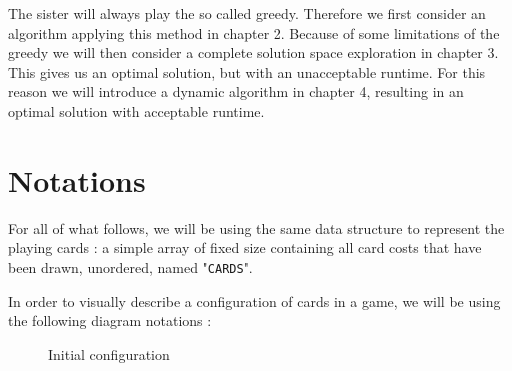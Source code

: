 \documentclass[a4paper,12pt,fleqn]{article}
\begin{document}
The sister will always play the so called \gls{greedy}. Therefore we first consider an algorithm applying this method in chapter 2. Because of some limitations of the \gls{greedy} we will then consider a complete solution space exploration in chapter 3. This gives us an optimal solution, but with an unacceptable runtime. For this reason we will introduce a dynamic algorithm in chapter 4, resulting in an optimal solution with acceptable runtime.

\newpage
\section{Notations}

For all of what follows, we will be using the same data structure to represent the playing cards : a simple array of fixed size containing all card costs that have been drawn, unordered, named "\texttt{CARDS}".

In order to visually describe a configuration of cards in a game, we will be using the following diagram notations :

\begin{figure}[H]
    \centering
    \caption{Initial configuration}
    \label{fig:example_diag_01}
\end{figure}
\end{document}
